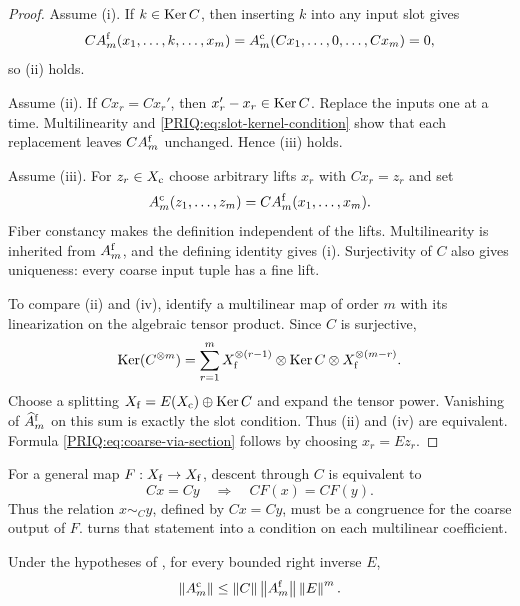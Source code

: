 \begin{proof}
Assume (i).  If $k\in\operatorname{Ker} C$, then inserting $k$ into any input slot gives
\[
  CA_m^{\mathrm f}(x_1,\ldots,k,\ldots,x_m)
  =
  A_m^{\mathrm c}(Cx_1,\ldots,0,\ldots,Cx_m)=0,
\]
so (ii) holds.

Assume (ii).  If $Cx_r=Cx_r'$, then $x_r'-x_r\in\operatorname{Ker} C$.  Replace the inputs one at a time.  Multilinearity and \eqref{PRIQ:eq:slot-kernel-condition} show that each replacement leaves $CA_m^{\mathrm f}$ unchanged.  Hence (iii) holds.

Assume (iii).  For $z_r\in X_{\mathrm c}$ choose arbitrary lifts $x_r$ with $Cx_r=z_r$ and set
\[
  A_m^{\mathrm c}(z_1,\ldots,z_m)
  =
  CA_m^{\mathrm f}(x_1,\ldots,x_m).
\]
Fiber constancy makes the definition independent of the lifts.  Multilinearity is inherited from $A_m^{\mathrm f}$, and the defining identity gives (i).  Surjectivity of $C$ also gives uniqueness: every coarse input tuple has a fine lift.

To compare (ii) and (iv), identify a multilinear map of order $m$ with its linearization on the algebraic tensor product.  Since $C$ is surjective,
\[
  \operatorname{Ker}(C^{\otimes m})
  =
  \sum_{r=1}^m
  X_{\mathrm f}^{\otimes(r-1)}\otimes\operatorname{Ker} C\otimes
  X_{\mathrm f}^{\otimes(m-r)}.
\]
Choose a splitting $X_{\mathrm f}=E(X_{\mathrm c})\oplus\operatorname{Ker} C$ and expand the tensor power.  Vanishing of $\widehat A_m^{\mathrm f}$ on this sum is exactly the slot condition.  Thus (ii) and (iv) are equivalent.  Formula \eqref{PRIQ:eq:coarse-via-section} follows by choosing $x_r=Ez_r$.
\end{proof}

\begin{PRIQremark}\label{PRIQ:rem:nonlinear-congruence}
For a general map $F:X_{\mathrm f}\to X_{\mathrm f}$, descent through $C$ is equivalent to
\[
  Cx=Cy
  \quad\Longrightarrow\quad
  CF(x)=CF(y).
\]
Thus the relation $x\sim_Cy$, defined by $Cx=Cy$, must be a congruence for the coarse output of $F$.   turns that statement into a condition on each multilinear coefficient.
\end{PRIQremark}

\begin{PRIQcorollary}\label{PRIQ:cor:bounded-coarse-tensor}
Under the hypotheses of , for every bounded right inverse $E$,
\[
  \left\lVert A_m^{\mathrm c}\right\rVert
  \leq
  \left\lVert C\right\rVert\left\lVert A_m^{\mathrm f}\right\rVert\left\lVert E\right\rVert^m.
\]
\end{PRIQcorollary}

